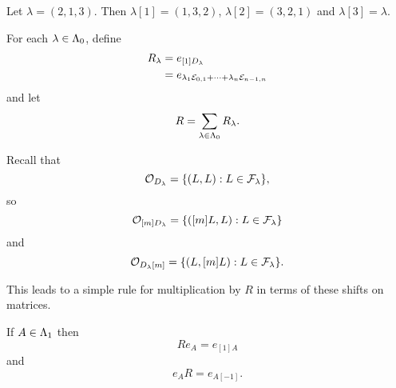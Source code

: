 \documentclass[a4paper, 11pt]{report}
\begin{document}
\begin{example}
Let $\lambda = (2,1,3)$. Then $\lambda[1]=(1,3,2)$, $\lambda[2]=(3,2,1)$ and $\lambda[3]=\lambda$.
\end{example}

For each $\lambda\in\Lambda_0{}$, define
\begin{align*}
R_\lambda &= e_{[1]D_{\lambda}}\\
&= e_{\lambda_1\mathcal{E}_{0,1}+\cdots +\lambda_n\mathcal{E}_{n-1,n}}
\end{align*}
and let
\begin{equation*}
R = \sum_{\lambda\in\Lambda_0{}} R_\lambda.
\end{equation*}

Recall that
\begin{equation*}
\mathcal{O}_{D_{\lambda}} = \{(L,L):L\in\mathcal{F}_\lambda\},
\end{equation*}
so
\begin{equation*}
\mathcal{O}_{[m]D_{\lambda}} = \{([m]L,L):L\in\mathcal{F}_\lambda\}
\end{equation*}
and
\begin{equation*}
\mathcal{O}_{D_{\lambda} [m]} = \{(L,[m]L):L\in\mathcal{F}_\lambda\}.
\end{equation*}

This leads to a simple rule for multiplication by $R$ in terms of these shifts on matrices.

\begin{lemma}\label{lemma:action-of-R}
If $A\in\Lambda_1{}$ then
\begin{equation*}
R e_A = e_{[1]A}
\end{equation*}
and
\begin{equation*}
e_A R = e_{A[-1]}.
\end{equation*}
\end{lemma}
\end{document}
